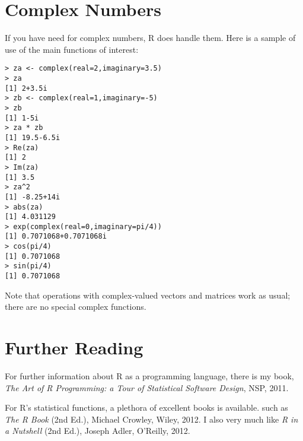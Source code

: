 \section{Complex Numbers}

If you have need for complex numbers, R does handle them.  Here is a
sample of use of the main functions of interest:

\begin{lstlisting}
> za <- complex(real=2,imaginary=3.5)
> za
[1] 2+3.5i
> zb <- complex(real=1,imaginary=-5)
> zb
[1] 1-5i
> za * zb
[1] 19.5-6.5i
> Re(za)
[1] 2
> Im(za)
[1] 3.5
> za^2
[1] -8.25+14i
> abs(za)
[1] 4.031129
> exp(complex(real=0,imaginary=pi/4))
[1] 0.7071068+0.7071068i
> cos(pi/4)
[1] 0.7071068
> sin(pi/4)
[1] 0.7071068
\end{lstlisting}

Note that operations with complex-valued vectors and matrices work as
usual; there are no special complex functions.

\section{Further Reading}

For further information about R as a programming language, there is my
book, {\it The Art of R Programming: a Tour of Statistical Software
Design}, NSP, 2011.

For R's statistical functions, a plethora of excellent books is
available. such as {\it The R Book} (2nd Ed.), Michael Crowley, Wiley,
2012.   I also very much like {\it R in a Nutshell} (2nd Ed.), Joseph Adler,
O'Reilly, 2012.
